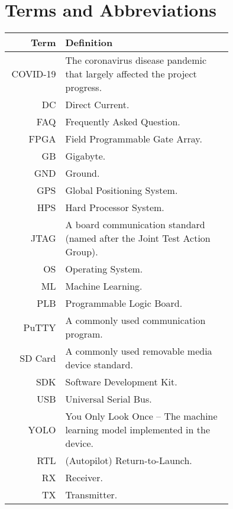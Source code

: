 \section*{Terms and Abbreviations}

\begin{tabular}[h]{rp{0.75\linewidth}}
    \hline
    \textbf{Term} & \textbf{Definition}\\
    \hline

    COVID-19 & The coronavirus disease pandemic that largely affected the project progress. \\
    DC & Direct Current. \\
	FAQ & Frequently Asked Question. \\
	FPGA & Field Programmable Gate Array. \\
	GB & Gigabyte. \\
	GND & Ground. \\
    GPS & Global Positioning System. \\
	HPS & Hard Processor System. \\
	JTAG & A board communication standard (named after the Joint Test Action Group).\\
	OS & Operating System. \\
	ML & Machine Learning. \\
	PLB & Programmable Logic Board. \\
	PuTTY & A commonly used communication program. \\
    SD Card & A commonly used removable media device standard. \\
    SDK & Software Development Kit. \\
    USB & Universal Serial Bus. \\
	YOLO & You Only Look Once -- The machine learning model implemented in the device.\\
    RTL & (Autopilot) Return-to-Launch.\\
    RX & Receiver.\\
    TX & Transmitter.\\
    \hline

\end{tabular}
